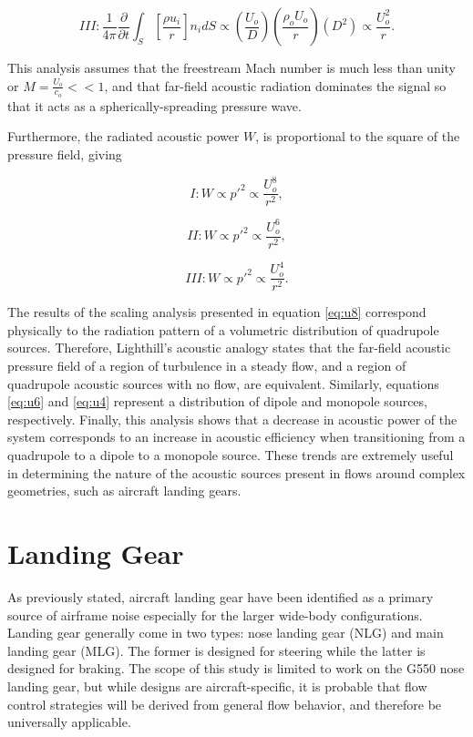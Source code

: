 \begin{equation}
III : \frac{1}{4\pi} \frac{\partial}{\partial t} \int_S \left[ \frac{\rho u_i}{r} \right] n_i dS \propto \left( \frac{U_o}{D} \right) \left( \frac{\rho_o U_o}{r} \right) \left( D^2 \right) \propto \frac{U_o^2}{r}.
\end{equation}

This analysis assumes that the freestream Mach number is much less than unity or $M = \frac{U_o}{c_o} << 1$, and that far-field acoustic radiation dominates the signal so that it acts as a spherically-spreading pressure wave. 

Furthermore, the radiated acoustic power $W$, is proportional to the square of the pressure field, giving

\begin{equation} \label{eq:u8}
I : W \propto p'^2 \propto \frac{U_o^8}{r^2},
\end{equation}

\begin{equation} \label{eq:u6}
II : W \propto p'^2 \propto \frac{U_o^6}{r^2},
\end{equation}

\begin{equation} \label{eq:u4}
III : W \propto p'^2 \propto \frac{U_o^4}{r^2}.
\end{equation}

The results of the scaling analysis presented in equation \ref{eq:u8} correspond physically to the radiation pattern of a volumetric distribution of quadrupole sources. Therefore, Lighthill's acoustic analogy states that the far-field acoustic pressure field of a region of turbulence in a steady flow, and  a region of quadrupole acoustic sources with no flow, are equivalent. Similarly, equations \ref{eq:u6} and \ref{eq:u4} represent a distribution of dipole and monopole sources, respectively. Finally, this analysis shows that a decrease in acoustic power of the system corresponds to an increase in acoustic efficiency when transitioning from a quadrupole to a dipole to a monopole source. These trends are extremely useful in determining the nature of the acoustic sources present in flows around complex geometries, such as aircraft landing gears.

\section{Landing Gear}
As previously stated, aircraft landing gear have been identified as a primary source of airframe noise especially for the larger wide-body configurations.
Landing gear generally come in two types: nose landing gear (NLG) and main landing gear (MLG). The former is designed for steering while the latter is designed for braking. 
The scope of this study is limited to work on the G550 nose landing gear, but while designs are aircraft-specific, it is probable that flow control strategies will be derived from general flow behavior, and therefore be universally applicable.


